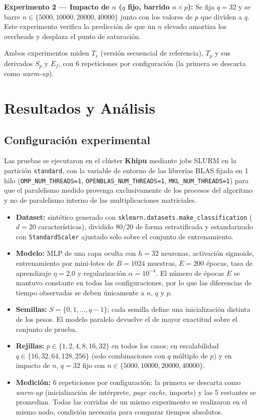 \documentclass[11pt, a4paper]{article}
\begin{document}
\textbf{Experimento 2 --- Impacto de $n$ ($q$ fijo, barrido $n \times p$):} Se fija $q = 32$ y se barre $n \in \{5000, 10000, 20000, 40000\}$ junto con los valores de $p$ que dividen a $q$. Este experimento verifica la predicción de que un $n$ elevado amortiza los overheads y desplaza el punto de saturación.

Ambos experimentos miden $T_s$ (versión secuencial de referencia), $T_p$ y sus derivados $S_p$ y $E_f$, con 6 repeticiones por configuración (la primera se descarta como \textit{warm-up}).


\section{Resultados y Análisis}

\subsection{Configuración experimental}

Las pruebas se ejecutaron en el clúster \textbf{Khipu} mediante jobs SLURM en la partición \texttt{standard}, con la variable de entorno de las librerías BLAS fijada en 1 hilo (\texttt{OMP\_NUM\_THREADS=1}, \texttt{OPENBLAS\_NUM\_THREADS=1}, \texttt{MKL\_NUM\_THREADS=1}) para que el paralelismo medido provenga exclusivamente de los procesos del algoritmo y no de paralelismo interno de las multiplicaciones matriciales.

\begin{itemize}
    \item \textbf{Dataset:} sintético generado con \texttt{sklearn.datasets.make\_classification} ($d = 20$ características), dividido 80/20 de forma estratificada y estandarizado con \texttt{StandardScaler} ajustado solo sobre el conjunto de entrenamiento.
    \item \textbf{Modelo:} MLP de una capa oculta con $h = 32$ neuronas, activación sigmoide, entrenamiento por mini-lotes de $B = 1024$ muestras, $E = 200$ épocas, tasa de aprendizaje $\eta = 2.0$ y regularización $\alpha = 10^{-4}$. El número de épocas $E$ se mantuvo constante en todas las configuraciones, por lo que las diferencias de tiempo observadas se deben únicamente a $n$, $q$ y $p$.
    \item \textbf{Semillas:} $S = \{0, 1, \dots, q-1\}$; cada semilla define una inicialización distinta de los pesos. El modelo paralelo devuelve el de mayor exactitud sobre el conjunto de prueba.
    \item \textbf{Rejillas:} $p \in \{1, 2, 4, 8, 16, 32\}$ en todos los casos; en escalabilidad $q \in \{16, 32, 64, 128, 256\}$ (solo combinaciones con $q$ múltiplo de $p$) y en impacto de $n$, $q = 32$ fijo con $n \in \{5000, 10000, 20000, 40000\}$.
    \item \textbf{Medición:} 6 repeticiones por configuración; la primera se descarta como \textit{warm-up} (inicialización de intérprete, \textit{page cache}, imports) y las 5 restantes se promedian. Todas las corridas de un mismo experimento se realizaron en el mismo nodo, condición necesaria para comparar tiempos absolutos.
\end{itemize}
\end{document}
